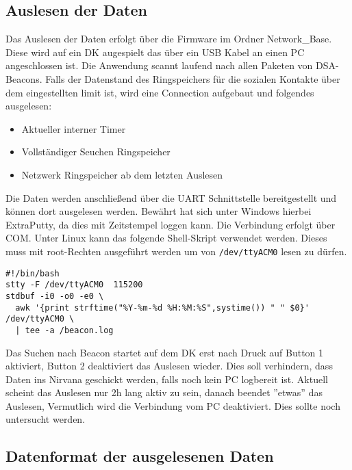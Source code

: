 \documentclass[11pt,ngerman]{scrartcl} %
\begin{document}
\subsection{Auslesen der Daten}

Das Auslesen der Daten erfolgt über die Firmware im Ordner Network\_Base. Diese wird auf ein DK augespielt das über ein USB Kabel an einen PC angeschlossen ist. Die Anwendung scannt laufend nach allen Paketen von DSA-Beacons. Falls der Datenstand des Ringspeichers für die sozialen Kontakte über dem eingestellten limit ist, wird eine Connection aufgebaut und folgendes ausgelesen:
\begin{itemize}
\item Aktueller interner Timer
\item Vollständiger Seuchen Ringspeicher
\item Netzwerk Ringspeicher ab dem letzten Auslesen
\end{itemize}

Die Daten werden anschließend über die UART Schnittstelle bereitgestellt und können dort ausgelesen werden. Bewährt hat sich unter Windows hierbei ExtraPutty, da dies mit Zeitstempel loggen kann. Die Verbindung erfolgt über COM. Unter Linux kann das folgende Shell-Skript verwendet werden. Dieses muss mit root-Rechten ausgeführt werden um von \verb|/dev/ttyACM0| lesen zu dürfen.

\begin{verbatim}
#!/bin/bash
stty -F /dev/ttyACM0  115200
stdbuf -i0 -o0 -e0 \
  awk '{print strftime("%Y-%m-%d %H:%M:%S",systime()) " " $0}' /dev/ttyACM0 \
  | tee -a /beacon.log
\end{verbatim}

Das Suchen nach Beacon startet auf dem DK erst nach Druck auf Button 1 aktiviert, Button 2 deaktiviert das Auslesen wieder. Dies soll verhindern, dass Daten ins Nirvana geschickt werden, falls noch kein PC logbereit ist.
Aktuell scheint das Auslesen nur 2h lang aktiv zu sein, danach beendet ''etwas'' das Auslesen, Vermutlich wird die Verbindung vom PC deaktiviert. Dies sollte noch untersucht werden.

\subsection{Datenformat der ausgelesenen Daten}
\end{document}
